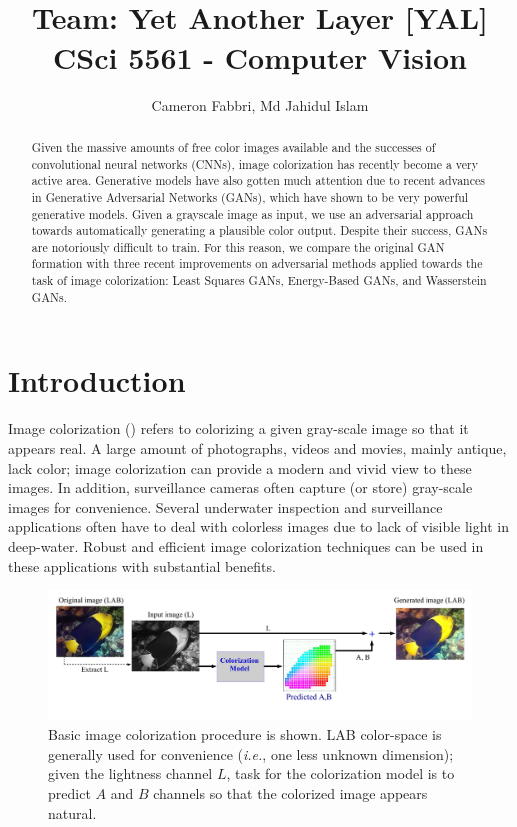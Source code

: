 \documentclass[10pt]{article}
\title{\textbf{\doctitle}\\
\small {Team: Yet Another Layer [YAL]} \\
\small CSci 5561 - Computer Vision }
\author{Cameron Fabbri, Md Jahidul Islam}
\date{}
\begin{document}
\maketitle

\begin{abstract}
Given the massive amounts of free color images available and the successes of convolutional neural networks (CNNs),
image colorization has recently become a very active area. Generative models have also gotten much attention due to
recent advances in Generative Adversarial Networks (GANs), which have shown to be very powerful generative models.
Given a grayscale image as input, we use an adversarial approach towards automatically generating a plausible color
output. Despite their success, GANs are notoriously difficult to train. For this reason, we compare the original GAN
formation with three recent improvements on adversarial methods applied towards the task of image colorization:
Least Squares GANs, Energy-Based GANs, and Wasserstein GANs.
\end{abstract}

\section{Introduction}\label{sec:intro}
Image colorization (\cite{zhang2016colorful, cheng2015deep, bugeau2014variational}) refers to colorizing a given gray-scale image so that it appears real. 
A large amount of photographs, videos and movies, mainly antique, lack color; image colorization can provide a modern and vivid view to these images. In addition, surveillance cameras often capture (or store) gray-scale images for convenience. Several underwater inspection and surveillance applications \cite{lu2013underwater, torres2005color} often have to deal with colorless images due to lack of visible light in deep-water. Robust and efficient image colorization techniques can be used in these applications with substantial benefits.   

\begin{figure}[h]
\vspace{-3mm}
\centering
\includegraphics[width=\linewidth]{Figs/6.pdf}
\vspace{-13mm}
\caption{Basic image colorization procedure is shown. LAB color-space is generally used for convenience (\textit{i.e.}, one less unknown dimension); given the lightness channel $L$, task for the colorization model is to predict $A$ and $B$ channels so that the colorized image appears natural. }
\label{fig:col}
\end{figure}  
\end{document}
